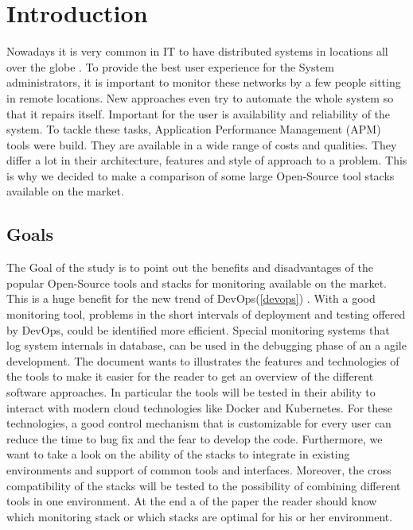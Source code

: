 
\chapter{Introduction}
Nowadays it is very common in IT to have distributed systems in locations all over the globe \cite{1687567}. To provide the best user experience for the System administrators, it is important to monitor these networks by a few people sitting in remote locations. New approaches even try to automate the whole system so that it repairs itself. Important for the user is availability and reliability of the system. 
To tackle these tasks, Application Performance Management (APM) tools were build. They are available in a wide range of costs and qualities. They differ a lot in their architecture, features and style of approach to a problem. This is why we decided to make a comparison of some large Open-Source tool stacks available on the market. 
\section{Goals}
The Goal of the study is to point out the benefits and disadvantages of the popular Open-Source tools and stacks for monitoring available on the market. This is a huge benefit for the new trend of DevOps(\cref{devops}) \cite{Bass:2015:DSA:2810087} . With a good monitoring tool, problems in the short intervals of deployment and testing offered by DevOps, could be identified more efficient. Special monitoring systems that log system internals in database, can be used in the debugging phase of an a agile development.  
The document wants to illustrates the features and technologies of the tools to make it easier for the reader to get an overview of the different software approaches. In particular the tools will be tested in their ability to interact with modern cloud technologies like Docker and Kubernetes.
For these technologies, a good control mechanism that is customizable for every user can reduce the time to bug fix and the fear to develop the code.
 Furthermore, we want to take a look on the ability of the stacks to integrate in existing environments and support of common tools and interfaces. Moreover, the cross compatibility of the stacks will be tested to the possibility of combining different tools in one environment. At the end a of the paper the reader should know which monitoring stack or which stacks are optimal for his or her environment.  

